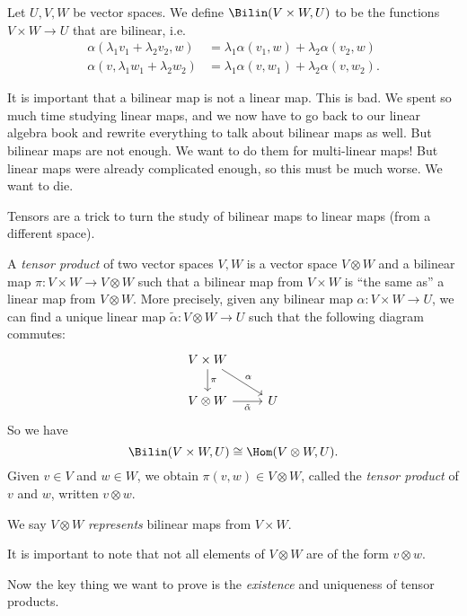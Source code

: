 \documentclass[a4paper]{article}
\begin{document}
\begin{defi}
  Let $U, V, W$ be vector spaces. We define $\Bilin(V\times W, U)$ to be the functions $V \times W \to U$ that are bilinear, i.e.\
  \begin{align*}
    \alpha(\lambda_1 v_1 + \lambda_2 v_2, w) &= \lambda_1 \alpha(v_1, w) + \lambda_2 \alpha(v_2, w)\\
    \alpha(v, \lambda_1 w_1 + \lambda_2 w_2) &= \lambda_1 \alpha(v, w_1) + \lambda_2 \alpha(v, w_2).
  \end{align*}
\end{defi}
It is important that a bilinear map is not a linear map. This is bad. We spent so much time studying linear maps, and we now have to go back to our linear algebra book and rewrite everything to talk about bilinear maps as well. But bilinear maps are not enough. We want to do them for multi-linear maps! But linear maps were already complicated enough, so this must be much worse. We want to die.

Tensors are a trick to turn the study of bilinear maps to linear maps (from a different space).

\begin{defi}[Tensor product]
  A \emph{tensor product} of two vector spaces $V, W$ is a vector space $V \otimes W$ and a bilinear map $\pi: V \times W \to V \otimes W$ such that a bilinear map from $V \times W$ is ``the same as'' a linear map from $V \otimes W$. More precisely, given any bilinear map $\alpha: V \times W \to U$, we can find a unique linear map $\tilde{\alpha}: V \otimes W \to U$ such that the following diagram commutes:
  \[
    \begin{tikzcd}
      V \times W \ar[rd, "\alpha"] \ar[d, "\pi"] \\
      V \otimes W \ar[r, "\tilde\alpha"'] & U
    \end{tikzcd}
  \]
  So we have
  \[
    \Bilin(V \times W, U) \cong \Hom(V \otimes W, U).
  \]
  Given $v \in V$ and $w \in W$, we obtain $\pi(v, w) \in V \otimes W$, called the \emph{tensor product} of $v$ and $w$, written $v \otimes w$.
\end{defi}
We say $V \otimes W$ \emph{represents} bilinear maps from $V \times W$.

It is important to note that not all elements of $V \otimes W$ are of the form $v \otimes w$.

Now the key thing we want to prove is the \emph{existence} and uniqueness of tensor products.
\end{document}
